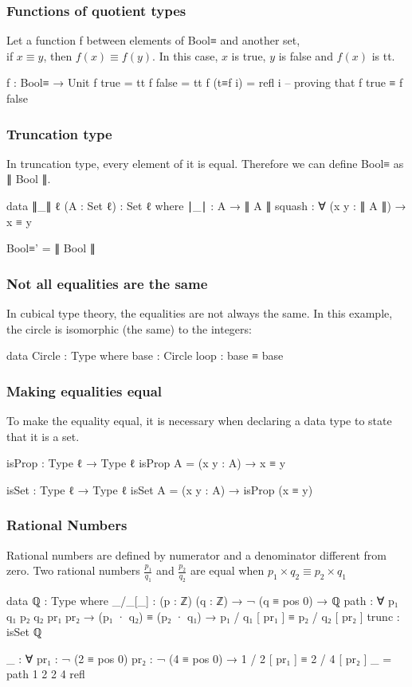 \documentclass{beamer}
\begin{document}
\begin{frame}
  \frametitle{Functions of quotient types}
  Let a function f between elements of Bool≡ and another set, \\
  if $ x \equiv y $, then $ f(x) \equiv f(y) $.
  In this case, $ x $ is true, $ y $ is false and $ f(x) $ is tt.
  \begin{code}
  f : Bool≡ → Unit
  f true    = tt
  f false   = tt
  f (t≡f i) = refl i -- proving that f true ≡ f false

  \end{code}

\end{frame}

\begin{frame}
  \frametitle{Truncation type}

  In truncation type, every element of it is equal.
  Therefore we can define Bool≡ as ∥ Bool ∥.

  \begin{code}
  data ∥_∥ {ℓ} (A : Set ℓ) : Set ℓ where
    ∣_∣ : A → ∥ A ∥
    squash : ∀ (x y : ∥ A ∥) → x ≡ y

  Bool≡' = ∥ Bool ∥
  \end{code}
\end{frame}

\begin{frame}
  \frametitle{Not all equalities are the same}
  In cubical type theory, the equalities are not always the same.
  In this example, the circle is isomorphic (the same) to the integers:
  \begin{code}
  data Circle : Type where
    base : Circle
    loop : base ≡ base
  \end{code}
\end{frame}

\begin{frame}
  \frametitle{Making equalities equal}
  To make the equality equal, it is necessary when declaring a data type to state that it is a set.
  \begin{code}
  isProp : Type ℓ → Type ℓ
  isProp A = (x y : A) → x ≡ y

  isSet : Type ℓ → Type ℓ
  isSet A = (x y : A) → isProp (x ≡ y)
  \end{code}
\end{frame}

\begin{frame}
  \frametitle{Rational Numbers}
  Rational numbers are defined by numerator and a denominator different from zero.
  Two rational numbers $ \frac{p_1}{q_1} $ and $ \frac{p_2}{q_2} $ are equal when $ p_1 \times q_2 \equiv p_2 \times q_1 $
  \begin{code}
  data ℚ : Type where
    _/_[_] : (p : ℤ) (q : ℤ) → ¬ (q ≡ pos 0) → ℚ
    path : ∀ p₁ q₁ p₂ q₂ {pr₁ pr₂} → (p₁ · q₂) ≡ (p₂ · q₁)
      → p₁ / q₁ [ pr₁ ] ≡ p₂ / q₂ [ pr₂ ]
    trunc : isSet ℚ

  _ : ∀ {pr₁ : ¬ (2 ≡ pos 0)} {pr₂ : ¬ (4 ≡ pos 0)}
    → 1 / 2 [ pr₁ ] ≡ 2 / 4 [ pr₂ ]
  _ = path 1 2 2 4 refl
  \end{code}
\end{frame}
\end{document}
